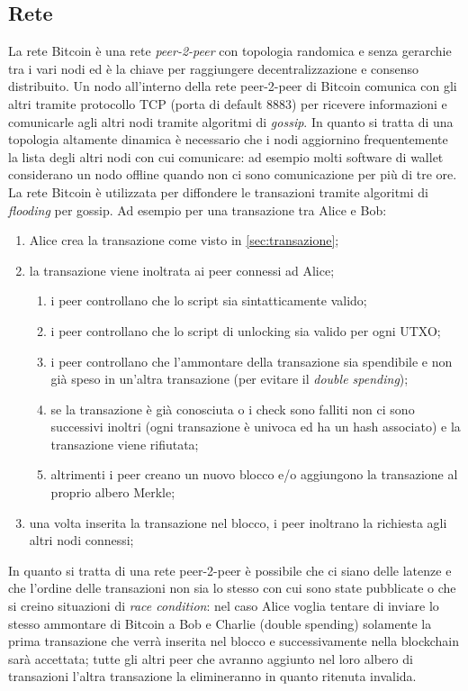 \subsection{Rete}
La rete Bitcoin è una rete \textit{peer-2-peer} con topologia randomica e senza gerarchie tra i vari nodi ed è la chiave per raggiungere decentralizzazione e consenso distribuito.\newline
Un nodo all'interno della rete peer-2-peer di Bitcoin comunica con gli altri tramite protocollo TCP (porta di default $8883$) per ricevere informazioni e comunicarle agli altri nodi tramite algoritmi di \textit{gossip}. In quanto si tratta di una topologia altamente dinamica è necessario che i nodi aggiornino frequentemente la lista degli altri nodi con cui comunicare: ad esempio molti software di wallet considerano un nodo offline quando non ci sono comunicazione per più di tre ore.\newline
La rete Bitcoin è utilizzata per diffondere le transazioni tramite algoritmi di \textit{flooding} per gossip. Ad esempio per una transazione tra Alice e Bob:
\begin{enumerate}
    \item Alice crea la transazione come visto in \ref{sec:transazione};
    \item la transazione viene inoltrata ai peer connessi ad Alice;
        \begin{enumerate}
            \item i peer controllano che lo script sia sintatticamente valido;
            \item i peer controllano che lo script di unlocking sia valido per ogni UTXO;
            \item i peer controllano che l'ammontare della transazione sia spendibile e non già speso in un'altra transazione (per evitare il \textit{double spending});
            \item se la transazione è già conosciuta o i check sono falliti non ci sono successivi inoltri (ogni transazione è univoca ed ha un hash associato) e la transazione viene rifiutata;
            \item altrimenti i peer creano un nuovo blocco e/o aggiungono la transazione al proprio albero Merkle;
        \end{enumerate}
    \item una volta inserita la transazione nel blocco, i peer inoltrano la richiesta agli altri nodi connessi;
\end{enumerate}
In quanto si tratta di una rete peer-2-peer è possibile che ci siano delle latenze e che l'ordine delle transazioni non sia lo stesso con cui sono state pubblicate o che si creino situazioni di \textit{race condition}: nel caso Alice voglia tentare di inviare lo stesso ammontare di Bitcoin a Bob e Charlie (double spending) solamente la prima transazione che verrà inserita nel blocco e successivamente nella blockchain sarà accettata; tutte gli altri peer che avranno aggiunto nel loro albero di transazioni l'altra transazione la elimineranno in quanto ritenuta invalida.\newline
